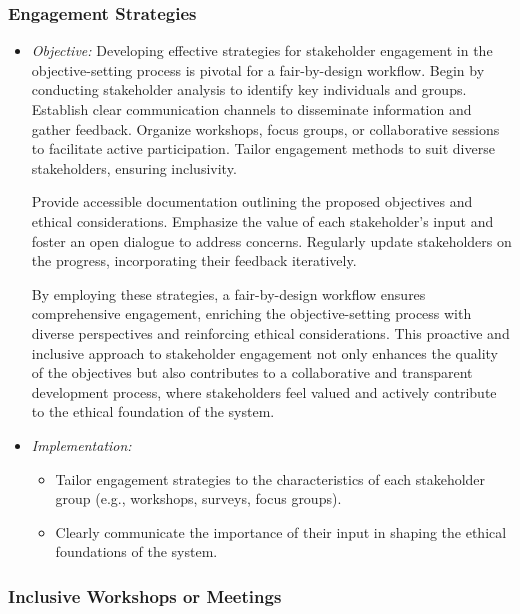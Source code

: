 \documentclass[12pt,a4paper,openright,twoside]{book}
\begin{document}
\subsubsection{Engagement Strategies}

\begin{itemize}

    \item \emph{Objective:} Developing effective strategies for stakeholder engagement in the objective-setting process is pivotal for a fair-by-design workflow. Begin by conducting stakeholder analysis to identify key individuals and groups. Establish clear communication channels to disseminate information and gather feedback. Organize workshops, focus groups, or collaborative sessions to facilitate active participation. Tailor engagement methods to suit diverse stakeholders, ensuring inclusivity.

    Provide accessible documentation outlining the proposed objectives and ethical considerations. Emphasize the value of each stakeholder's input and foster an open dialogue to address concerns. Regularly update stakeholders on the progress, incorporating their feedback iteratively.
    
    By employing these strategies, a fair-by-design workflow ensures comprehensive engagement, enriching the objective-setting process with diverse perspectives and reinforcing ethical considerations. This proactive and inclusive approach to stakeholder engagement not only enhances the quality of the objectives but also contributes to a collaborative and transparent development process, where stakeholders feel valued and actively contribute to the ethical foundation of the system.

    \item \emph{Implementation:}

    \begin{itemize}

        \item Tailor engagement strategies to the characteristics of each stakeholder group (e.g., workshops, surveys, focus groups).

        \item Clearly communicate the importance of their input in shaping the ethical foundations of the system.

    \end{itemize}

\end{itemize}

\subsubsection{Inclusive Workshops or Meetings}
\end{document}
